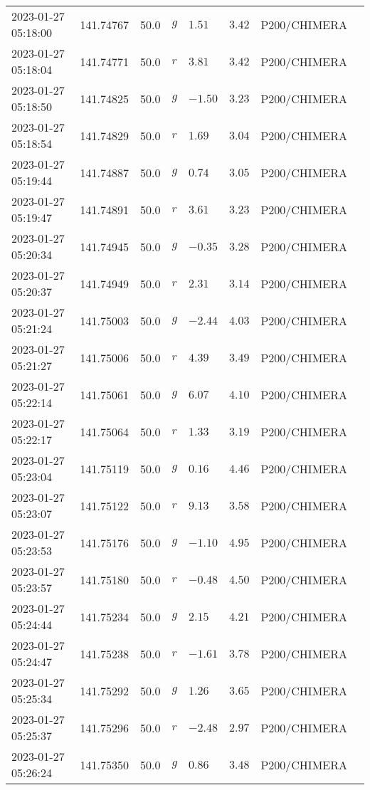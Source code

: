 \documentclass{nature_plusfigure}
\begin{document}
\begin{supplement}
\begin{center}
\begin{longtable}{llllllll}
2023-01-27 05:18:00 & 141.74767 & 50.0 & $g$ & $1.51$ & $3.42$ & P200/CHIMERA &  \\ 
2023-01-27 05:18:04 & 141.74771 & 50.0 & $r$ & $3.81$ & $3.42$ & P200/CHIMERA &  \\ 
2023-01-27 05:18:50 & 141.74825 & 50.0 & $g$ & $-1.50$ & $3.23$ & P200/CHIMERA &  \\ 
2023-01-27 05:18:54 & 141.74829 & 50.0 & $r$ & $1.69$ & $3.04$ & P200/CHIMERA &  \\ 
2023-01-27 05:19:44 & 141.74887 & 50.0 & $g$ & $0.74$ & $3.05$ & P200/CHIMERA &  \\ 
2023-01-27 05:19:47 & 141.74891 & 50.0 & $r$ & $3.61$ & $3.23$ & P200/CHIMERA &  \\ 
2023-01-27 05:20:34 & 141.74945 & 50.0 & $g$ & $-0.35$ & $3.28$ & P200/CHIMERA &  \\ 
2023-01-27 05:20:37 & 141.74949 & 50.0 & $r$ & $2.31$ & $3.14$ & P200/CHIMERA &  \\ 
2023-01-27 05:21:24 & 141.75003 & 50.0 & $g$ & $-2.44$ & $4.03$ & P200/CHIMERA &  \\ 
2023-01-27 05:21:27 & 141.75006 & 50.0 & $r$ & $4.39$ & $3.49$ & P200/CHIMERA &  \\ 
2023-01-27 05:22:14 & 141.75061 & 50.0 & $g$ & $6.07$ & $4.10$ & P200/CHIMERA &  \\ 
2023-01-27 05:22:17 & 141.75064 & 50.0 & $r$ & $1.33$ & $3.19$ & P200/CHIMERA &  \\ 
2023-01-27 05:23:04 & 141.75119 & 50.0 & $g$ & $0.16$ & $4.46$ & P200/CHIMERA &  \\ 
2023-01-27 05:23:07 & 141.75122 & 50.0 & $r$ & $9.13$ & $3.58$ & P200/CHIMERA &  \\ 
2023-01-27 05:23:53 & 141.75176 & 50.0 & $g$ & $-1.10$ & $4.95$ & P200/CHIMERA &  \\ 
2023-01-27 05:23:57 & 141.75180 & 50.0 & $r$ & $-0.48$ & $4.50$ & P200/CHIMERA &  \\ 
2023-01-27 05:24:44 & 141.75234 & 50.0 & $g$ & $2.15$ & $4.21$ & P200/CHIMERA &  \\ 
2023-01-27 05:24:47 & 141.75238 & 50.0 & $r$ & $-1.61$ & $3.78$ & P200/CHIMERA &  \\ 
2023-01-27 05:25:34 & 141.75292 & 50.0 & $g$ & $1.26$ & $3.65$ & P200/CHIMERA &  \\ 
2023-01-27 05:25:37 & 141.75296 & 50.0 & $r$ & $-2.48$ & $2.97$ & P200/CHIMERA &  \\ 
2023-01-27 05:26:24 & 141.75350 & 50.0 & $g$ & $0.86$ & $3.48$ & P200/CHIMERA &  \\ 

\end{longtable}
\end{center}
\end{supplement}
\end{document}
